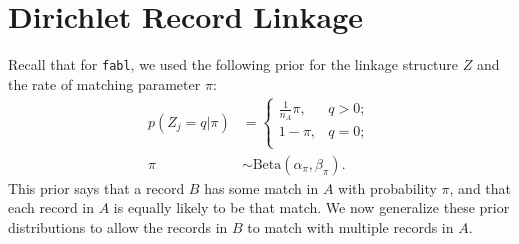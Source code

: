 \documentclass[12pt,letterpaper]{article}
\newcommand{\1}[1]{\mathbb{I}\!\left[#1\right]} %
\begin{document}
%
%

\section{Dirichlet Record Linkage}

Recall that for \texttt{fabl}, we used the following prior for the linkage structure $Z$ and the rate of matching parameter $\pi$:
\begin{subequations}
	\begin{align}
		p(Z_j = q| \pi)  &=
		\begin{cases} 
			\frac{1}{n_A}\pi,  & q > 0; \\
			1-\pi, &  q  = 0; \\
		\end{cases} \label{eqn:fabl_prior}\\
		\pi &\sim \text{Beta}(\alpha_{\pi}, \beta_{\pi})\label{eqn:pi_beta}.
	\end{align}
\end{subequations}
This prior says that a record $B$ has some match in $A$ with probability $\pi$, and that each record in $A$ is equally likely to be that match. We now generalize these prior distributions to allow the records in $B$ to match with multiple records in $A$. 
\end{document}
